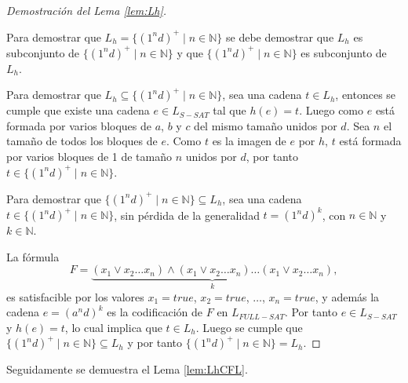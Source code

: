 \begin{proof}[Demostración del Lema \ref{lem:Lh}] \
    
    Para demostrar que $L_h=\{(1^nd)^+\mid n\in \mathbb{N}\}$ se debe demostrar que $L_h$ es subconjunto de $\{(1^nd)^+\mid n\in \mathbb{N}\}$ y 
    que $\{(1^nd)^+\mid n\in \mathbb{N}\}$ es subconjunto de $L_h$.
    
    Para demostrar que $L_h\subseteq \{(1^nd)^+\mid n\in \mathbb{N}\}$, sea una cadena $t\in L_h$, entonces se cumple que existe una cadena $e\in L_{S-SAT}$ tal que $h(e)=t$. Luego como $e$ está formada por varios bloques de $a$, $b$ y $c$ del mismo tamaño unidos por $d$. Sea $n$ el tamaño de todos los bloques de $e$. Como $t$ es la imagen de $e$ por $h$, $t$ está formada por varios bloques de 1 de tamaño $n$ unidos por $d$, por tanto $t\in \{(1^nd)^+\mid n\in \mathbb{N}\}$.
    
    Para demostrar que $\{(1^nd)^+\mid n\in \mathbb{N}\}\subseteq L_h$, sea una cadena $t\in \{(1^nd)^+\mid n\in \mathbb{N}\}$, sin pérdida de la generalidad $t=(1^nd)^k$, con $n\in \mathbb{N}$ y $k\in \mathbb{N}$.
    
    La fórmula
    $$F=\underbrace{(x_1\vee x_2 \ldots x_n) \wedge (x_1\vee x_2 \ldots x_n) \ldots (x_1\vee x_2 \ldots x_n)}_{k},$$
    es satisfacible por los valores $x_1=true$, $x_2=true$, $\ldots$, $x_n=true$, y además la cadena $e=(a^nd)^k$ es la codificación de $F$ en $L_{FULL-SAT}$. Por tanto $e\in L_{S-SAT}$ y $h(e)=t$, lo cual implica que $t\in L_h$. Luego se cumple que $\{(1^nd)^+\mid n\in \mathbb{N}\}\subseteq L_h$ y por tanto $\{(1^nd)^+\mid n\in \mathbb{N}\}= L_h$.
\end{proof}

Seguidamente se demuestra el Lema \ref{lem:LhCFL}.

